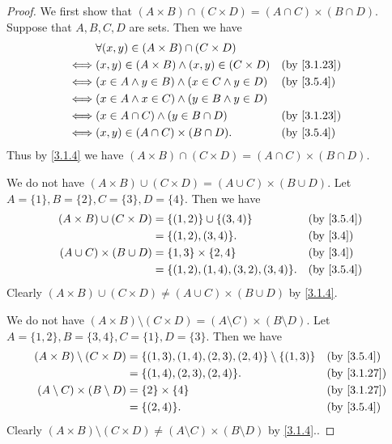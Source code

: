 \begin{proof}
  We first show that \((A \times B) \cap (C \times D) = (A \cap C) \times (B \cap D)\).
  Suppose that \(A, B, C, D\) are sets.
  Then we have
  \begin{align*}
         & \forall (x, y) \in (A \times B) \cap (C \times D)                      \\
    \iff & (x, y) \in (A \times B) \land (x, y) \in (C \times D) &  & \by{3.1.23} \\
    \iff & (x \in A \land y \in B) \land (x \in C \land y \in D) &  & \by{3.5.4}  \\
    \iff & (x \in A \land x \in C) \land (y \in B \land y \in D)                  \\
    \iff & (x \in A \cap C) \land (y \in B \cap D)               &  & \by{3.1.23} \\
    \iff & (x, y) \in (A \cap C) \times (B \cap D).              &  & \by{3.5.4}
  \end{align*}
  Thus by \cref{3.1.4} we have \((A \times B) \cap (C \times D) = (A \cap C) \times (B \cap D)\).

  We do not have \((A \times B) \cup (C \times D) = (A \cup C) \times (B \cup D)\).
  Let \(A = \{1\}, B = \{2\}, C = \{3\}, D = \{4\}\).
  Then we have
  \begin{align*}
    (A \times B) \cup (C \times D) & = \{(1, 2)\} \cup \{(3, 4)\}          &  & \by{3.5.4}             \\
                                   & = \{(1, 2), (3, 4)\}.                 &  & \text{(by \cref{3.4})} \\
    (A \cup C) \times (B \cup D)   & = \{1, 3\} \times \{2, 4\}            &  & \text{(by \cref{3.4})} \\
                                   & = \{(1, 2), (1, 4), (3, 2), (3, 4)\}. &  & \by{3.5.4}
  \end{align*}
  Clearly \((A \times B) \cup (C \times D) \neq (A \cup C) \times (B \cup D)\) by \cref{3.1.4}.

  We do not have \((A \times B) \setminus (C \times D) = (A \setminus C) \times (B \setminus D)\).
  Let \(A = \{1, 2\}, B = \{3, 4\}, C = \{1\}, D = \{3\}\).
  Then we have
  \begin{align*}
    (A \times B) \setminus (C \times D)    & = \{(1, 3), (1, 4), (2, 3), (2, 4)\} \setminus \{(1, 3)\} &  & \by{3.5.4}  \\
                                           & = \{(1, 4), (2, 3), (2, 4)\}.                             &  & \by{3.1.27} \\
    (A \setminus C) \times (B \setminus D) & = \{2\} \times \{4\}                                      &  & \by{3.1.27} \\
                                           & = \{(2, 4)\}.                                             &  & \by{3.5.4}
  \end{align*}
  Clearly \((A \times B) \setminus (C \times D) \neq (A \setminus C) \times (B \setminus D)\) by \cref{3.1.4}..
\end{proof}

